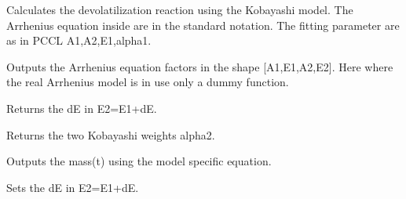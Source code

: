\documentclass[letterpaper,10pt,english]{sphinxmanual}
\begin{document}
\begin{fulllineitems}
\label{FittingClasses:Models.KobayashiPCCL}
Calculates the devolatilization reaction using the Kobayashi model. The Arrhenius equation inside are in the standard notation. The fitting parameter are as in PCCL A1,A2,E1,alpha1.

\begin{fulllineitems}
\label{FittingClasses:Models.KobayashiPCCL.ConvertKinFactors}
Outputs the Arrhenius equation factors in the shape {[}A1,E1,A2,E2{]}. Here where the real Arrhenius model is in use only a dummy function.

\end{fulllineitems}


\begin{fulllineitems}
\label{FittingClasses:Models.KobayashiPCCL.E2Diff}
Returns the dE in E2=E1+dE.

\end{fulllineitems}


\begin{fulllineitems}
\label{FittingClasses:Models.KobayashiPCCL.KobWeights}
Returns the two Kobayashi weights alpha2.

\end{fulllineitems}


\begin{fulllineitems}
\label{FittingClasses:Models.KobayashiPCCL.calcMass}
Outputs the mass(t) using the model specific equation.

\end{fulllineitems}


\begin{fulllineitems}
\label{FittingClasses:Models.KobayashiPCCL.setE2Diff}
Sets the dE in E2=E1+dE.


\end{fulllineitems}
\end{fulllineitems}
\end{document}
